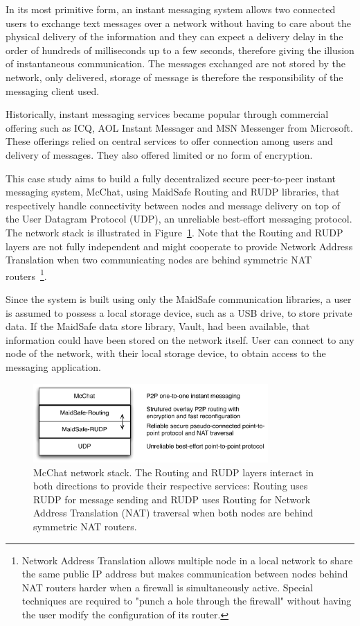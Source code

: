 In its most primitive form, an instant messaging system allows two connected users to exchange text messages over a network without having to care about the physical delivery of the information and they can expect a delivery delay in the order of hundreds of milliseconds up to a few seconds, therefore giving the illusion of instantaneous communication. The messages exchanged are not stored by the network, only delivered, storage of message is therefore the responsibility of the messaging client used.

Historically, instant messaging services became popular through commercial offering such as ICQ, AOL Instant Messager and MSN Messenger from Microsoft. These offerings relied on central services to offer connection among users and delivery of messages. They also offered limited or no form of encryption. 

This case study aims to build a fully decentralized secure peer-to-peer instant messaging system, McChat, using MaidSafe Routing and RUDP libraries, that respectively handle connectivity between nodes and message delivery on top of the User Datagram Protocol (UDP), an unreliable best-effort messaging protocol. The network stack is illustrated in Figure~\ref{fig:Stack}. Note that the Routing and RUDP layers are not fully independent and might cooperate to provide Network Address Translation when two communicating nodes are behind symmetric NAT routers~\footnote{Network Address Translation allows multiple node in a local network to share the same public IP address but makes communication between nodes behind NAT routers harder when a firewall is simultaneously active. Special techniques are required to "punch a hole through the firewall" without having the user modify the configuration of its router.}.

Since the system is built using only the MaidSafe communication libraries, a user is assumed to possess a local storage device, such as a USB drive, to store private data. If the MaidSafe data store library, Vault, had been available, that information could have been stored on the network itself. User can connect to any node of the network, with their local storage device, to obtain access to the messaging application.

\begin{figure}[htb]
\begin{center}
\includegraphics[width=0.8\textwidth]{figures/stack}
\caption[McChat network stack]{\label{fig:Stack} McChat network stack. The Routing and RUDP layers interact in both directions to provide their respective services: Routing uses RUDP for message sending and RUDP uses Routing for Network Address Translation (NAT) traversal when both nodes are behind symmetric NAT routers.}
\end{center}
\end{figure}

